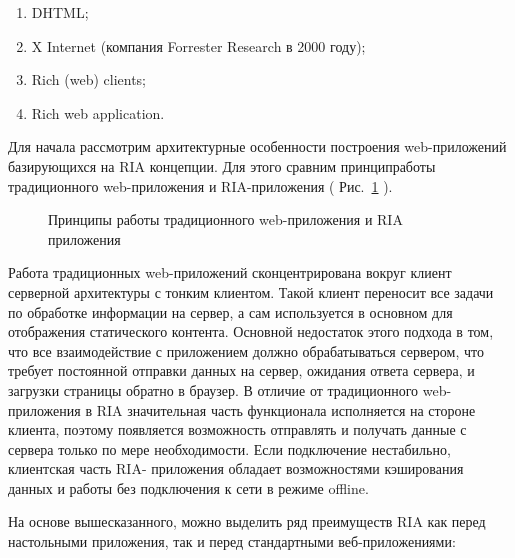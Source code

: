 \begin{enumerate}

\item DHTML;
\item X Internet (компания Forrester Research в 2000 году);
\item Rich (web) clients; 
\item Rich web application. 

\end{enumerate}

Для начала рассмотрим архитектурные особенности построения web-приложений базирующихся 
на RIA  концепции.  Для этого сравним принципработы традиционного web-приложения и 
RIA-приложения ( Рис.~\ref{ris:principlesRIA.png} ).  
\begin{figure}[h]
\caption{Принципы работы традиционного web-приложения и RIA приложения}
\label{ris:principlesRIA.png}
\end{figure}

Работа традиционных web-приложений сконцентрирована вокруг клиент серверной архитектуры 
с тонким клиентом.  Такой клиент переносит все задачи по обработке информации на сервер, 
а сам используется в основном для отображения статического контента.  Основной 
недостаток этого подхода в том,  что все взаимодействие с приложением должно 
обрабатываться сервером,  что требует постоянной отправки данных на сервер,  
ожидания ответа сервера, и загрузки страницы обратно в браузер. В отличие от 
традиционного web-приложения в RIA  значительная часть функционала исполняется на 
стороне клиента,  поэтому появляется возможность отправлять и получать данные с сервера 
только по мере необходимости.  Если подключение нестабильно,  клиентская часть RIA- 
приложения обладает возможностями кэширования данных и работы без подключения к сети в 
режиме offline.

На основе вышесказанного, можно выделить ряд преимуществ RIA  как перед настольными приложения, 
так и перед стандартными веб-приложениями:

